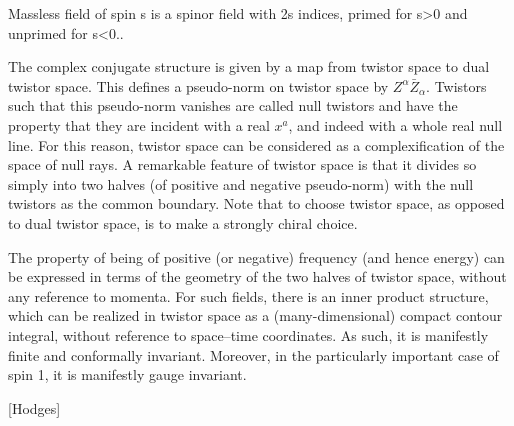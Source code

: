 Massless field of spin s is a spinor field with 2s indices, primed for s>0 and unprimed for s<0..

The complex conjugate structure is given by a map from twistor space to dual twistor space. This defines a pseudo-norm on twistor space by $Z^\alpha \bar{Z}_\alpha$. Twistors such that this pseudo-norm vanishes are called null twistors and have the property that they are incident with a real $x^a$, and indeed with a whole real null line. For this reason, twistor space can be considered as a complexification of the space of null rays. A remarkable feature of twistor space is that it divides so simply into two halves (of positive and negative pseudo-norm) with the null twistors as the common boundary. Note that to choose twistor space, as opposed to dual twistor space, is to make a strongly chiral choice.

The property of being of positive (or negative) frequency (and hence energy) can be expressed in terms of the geometry of the two halves of twistor space, without any reference to momenta. For such fields, there is an inner product structure, which can be realized in twistor space as a (many-dimensional) compact contour integral, without reference
to space–time coordinates. As such, it is manifestly finite and conformally invariant. Moreover, in the particularly important case of spin 1, it is manifestly gauge invariant.

[Hodges]

